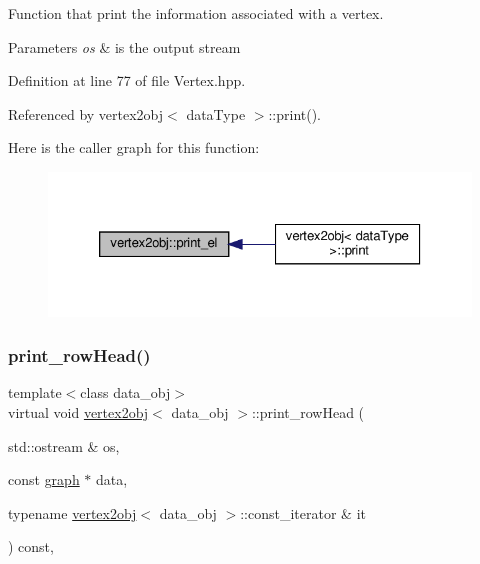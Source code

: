 Function that print the information associated with a vertex. 


\begin{DoxyParams}{Parameters}
{\em os} & is the output stream \\
\hline
\end{DoxyParams}


Definition at line 77 of file Vertex.\+hpp.



Referenced by vertex2obj$<$ data\+Type $>$\+::print().

Here is the caller graph for this function\+:
\nopagebreak
\begin{figure}[H]
\begin{center}
\leavevmode
\includegraphics[width=326pt]{d4/d5c/structvertex2obj_a2cfa844f7671d7b698495e6078879d9b_icgraph}
\end{center}
\end{figure}
\mbox{\label{structvertex2obj_aa339d6dd020c8d0166311a129a9182b5}} 
\subsubsection{\texorpdfstring{print\+\_\+row\+Head()}{print\_rowHead()}}
{\footnotesize\ttfamily template$<$class data\+\_\+obj$>$ \\
virtual void \hyperlink{structvertex2obj}{vertex2obj}$<$ data\+\_\+obj $>$\+::print\+\_\+row\+Head (\begin{DoxyParamCaption}\item[{std\+::ostream \&}]{os,  }\item[{const \hyperlink{structgraph}{graph} $\ast$}]{data,  }\item[{typename \hyperlink{structvertex2obj}{vertex2obj}$<$ data\+\_\+obj $>$\+::const\+\_\+iterator \&}]{it }\end{DoxyParamCaption}) const\hspace{0.3cm}{\ttfamily [inline]}, {\ttfamily [virtual]}}



